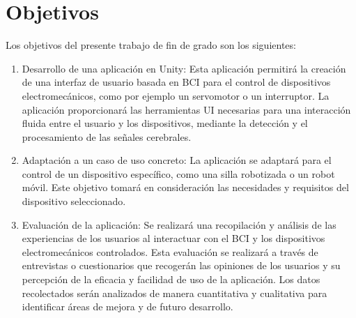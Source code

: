 \section{Objetivos}

Los objetivos del presente trabajo de fin de grado son los siguientes:

\begin{enumerate}
\item Desarrollo de una aplicación en Unity: Esta aplicación permitirá la creación de una interfaz de usuario basada en BCI para el control de dispositivos electromecánicos, como por ejemplo un servomotor o un interruptor. La aplicación proporcionará las herramientas UI necesarias para una interacción fluida entre el usuario y los dispositivos, mediante la detección y el procesamiento de las señales cerebrales.

\item Adaptación a un caso de uso concreto: La aplicación se adaptará para el control de un dispositivo específico, como una silla robotizada o un robot móvil. Este objetivo tomará en consideración las necesidades y requisitos del dispositivo seleccionado.

\item Evaluación de la aplicación: Se realizará una recopilación y análisis de las experiencias de los usuarios al interactuar con el BCI y los dispositivos electromecánicos controlados. Esta evaluación se realizará a través de entrevistas o cuestionarios que recogerán las opiniones de los usuarios y su percepción de la eficacia y facilidad de uso de la aplicación. Los datos recolectados serán analizados de manera cuantitativa y cualitativa para identificar áreas de mejora y de futuro desarrollo.
\end{enumerate}